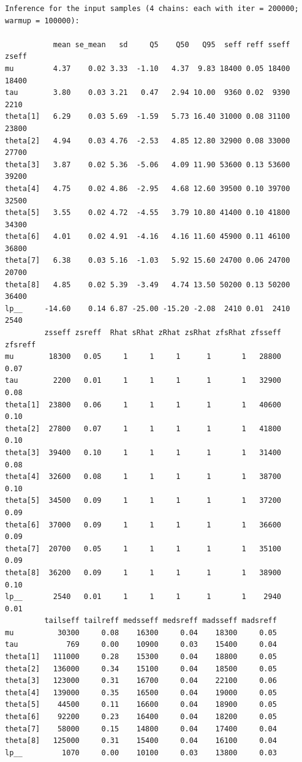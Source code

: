 \documentclass[american,]{article}
\begin{document}
\begin{verbatim}
Inference for the input samples (4 chains: each with iter = 200000; warmup = 100000):

           mean se_mean   sd     Q5    Q50   Q95  seff reff sseff zseff
mu         4.37    0.02 3.33  -1.10   4.37  9.83 18400 0.05 18400 18400
tau        3.80    0.03 3.21   0.47   2.94 10.00  9360 0.02  9390  2210
theta[1]   6.29    0.03 5.69  -1.59   5.73 16.40 31000 0.08 31100 23800
theta[2]   4.94    0.03 4.76  -2.53   4.85 12.80 32900 0.08 33000 27700
theta[3]   3.87    0.02 5.36  -5.06   4.09 11.90 53600 0.13 53600 39200
theta[4]   4.75    0.02 4.86  -2.95   4.68 12.60 39500 0.10 39700 32500
theta[5]   3.55    0.02 4.72  -4.55   3.79 10.80 41400 0.10 41800 34300
theta[6]   4.01    0.02 4.91  -4.16   4.16 11.60 45900 0.11 46100 36800
theta[7]   6.38    0.03 5.16  -1.03   5.92 15.60 24700 0.06 24700 20700
theta[8]   4.85    0.02 5.39  -3.49   4.74 13.50 50200 0.13 50200 36400
lp__     -14.60    0.14 6.87 -25.00 -15.20 -2.08  2410 0.01  2410  2540
         zsseff zsreff  Rhat sRhat zRhat zsRhat zfsRhat zfsseff zfsreff
mu        18300   0.05     1     1     1      1       1   28800    0.07
tau        2200   0.01     1     1     1      1       1   32900    0.08
theta[1]  23800   0.06     1     1     1      1       1   40600    0.10
theta[2]  27800   0.07     1     1     1      1       1   41800    0.10
theta[3]  39400   0.10     1     1     1      1       1   31400    0.08
theta[4]  32600   0.08     1     1     1      1       1   38700    0.10
theta[5]  34500   0.09     1     1     1      1       1   37200    0.09
theta[6]  37000   0.09     1     1     1      1       1   36600    0.09
theta[7]  20700   0.05     1     1     1      1       1   35100    0.09
theta[8]  36200   0.09     1     1     1      1       1   38900    0.10
lp__       2540   0.01     1     1     1      1       1    2940    0.01
         tailseff tailreff medsseff medsreff madsseff madsreff
mu          30300     0.08    16300     0.04    18300     0.05
tau           769     0.00    10900     0.03    15400     0.04
theta[1]   111000     0.28    15300     0.04    18800     0.05
theta[2]   136000     0.34    15100     0.04    18500     0.05
theta[3]   123000     0.31    16700     0.04    22100     0.06
theta[4]   139000     0.35    16500     0.04    19000     0.05
theta[5]    44500     0.11    16600     0.04    18900     0.05
theta[6]    92200     0.23    16400     0.04    18200     0.05
theta[7]    58000     0.15    14800     0.04    17400     0.04
theta[8]   125000     0.31    15400     0.04    16100     0.04
lp__         1070     0.00    10100     0.03    13800     0.03
\end{verbatim}
\end{document}
